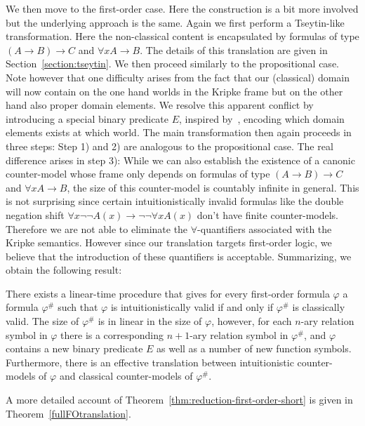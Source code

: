 \documentclass[a4paper,UKenglish,cleveref, autoref, thm-restate]{lipics-v2021}
\begin{document}
We then move to the first-order case. Here the construction is a bit more involved but the underlying approach is the same.
Again we first perform a Tseytin-like transformation.
Here the non-classical content is encapsulated by formulas of type $(A\to B)\to C$ and $\forall xA\to B$.
The details of this translation are given in Section~\ref{section:tseytin}.
We then proceed similarly to the propositional case.
Note however that one difficulty arises from the fact that our (classical) domain will now contain on the one hand worlds in the Kripke frame but on the other hand also proper domain elements.
We resolve this apparent conflict by introducing a special binary predicate $E$, inspired by~\cite{iemhoff2010eskolemization}, encoding which domain elements exists at which world.
The main transformation then again proceeds in three steps:
Step 1) and 2) are analogous to the propositional case.
The real difference arises in step 3):
While we can also establish the existence of a canonic counter-model whose frame only depends on formulas of type $(A\to B)\to C$ and $\forall xA\to B$, the size of this counter-model is countably infinite in general.
This is not surprising since certain intuitionistically invalid formulas like the double negation shift $\forall x\neg\neg A(x)\to \neg\neg\forall x A(x)$ don't have finite counter-models.
Therefore we are not able to eliminate the $\forall$-quantifiers associated with the Kripke semantics.
However since our translation targets first-order logic, we believe that the introduction of these quantifiers is acceptable.
%
Summarizing, we obtain the following result:

\begin{theorem}
\label{thm:reduction-first-order-short}
There exists a linear-time procedure that gives for every first-order formula $\varphi$ a formula $\varphi^\#$ such that $\varphi$ is intuitionistically valid if and only if $\varphi^\#$ is classically valid. The size of $\varphi^\#$ is in linear in the size of $\varphi$, however, for each $n$-ary relation symbol in $\varphi$ there is a corresponding $n+1$-ary relation symbol in $\varphi^\#$, and $\varphi$ contains a new binary predicate $E$ as well as a number of new function symbols. Furthermore, there is an effective translation between intuitionistic counter-models of $\varphi$ and classical counter-models of $\varphi^\#$.
\end{theorem}
A more detailed account of Theorem~\ref{thm:reduction-first-order-short} is given in Theorem~\ref{fullFOtranslation}.
\end{document}
